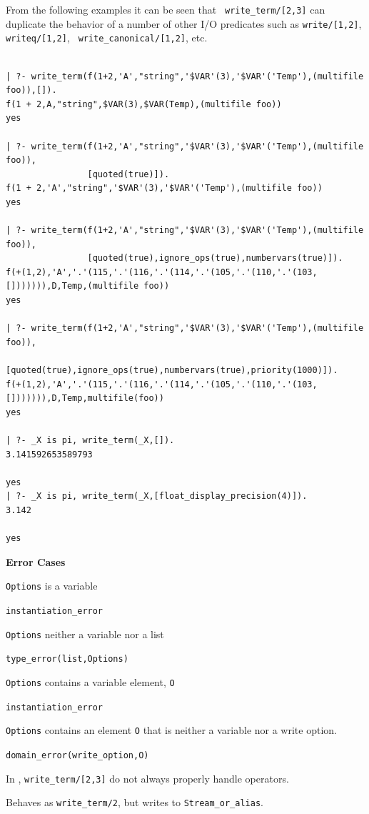 \begin{description}
From the following examples it can be seen that {\tt
write\_term/[2,3]} can duplicate the behavior of a number of other
I/O predicates such as {\tt write/[1,2]}, {\tt writeq/[1,2]}, {\tt
write\_canonical/[1,2]}, etc.
{\small
\begin{verbatim}

| ?- write_term(f(1+2,'A',"string",'$VAR'(3),'$VAR'('Temp'),(multifile foo)),[]).
f(1 + 2,A,"string",$VAR(3),$VAR(Temp),(multifile foo))
yes

| ?- write_term(f(1+2,'A',"string",'$VAR'(3),'$VAR'('Temp'),(multifile foo)),
                [quoted(true)]).
f(1 + 2,'A',"string",'$VAR'(3),'$VAR'('Temp'),(multifile foo))
yes

| ?- write_term(f(1+2,'A',"string",'$VAR'(3),'$VAR'('Temp'),(multifile foo)),
                [quoted(true),ignore_ops(true),numbervars(true)]).
f(+(1,2),'A','.'(115,'.'(116,'.'(114,'.'(105,'.'(110,'.'(103,[])))))),D,Temp,(multifile foo))
yes

| ?- write_term(f(1+2,'A',"string",'$VAR'(3),'$VAR'('Temp'),(multifile foo)),
                [quoted(true),ignore_ops(true),numbervars(true),priority(1000)]).
f(+(1,2),'A','.'(115,'.'(116,'.'(114,'.'(105,'.'(110,'.'(103,[])))))),D,Temp,multifile(foo))
yes

| ?- _X is pi, write_term(_X,[]).
3.141592653589793

yes
| ?- _X is pi, write_term(_X,[float_display_precision(4)]).
3.142

yes
\end{verbatim}
}

{\bf Error Cases} 
\bi
\item 	{\tt Options} is a variable
\bi
\item    {\tt instantiation\_error}
\ei
\item 	{\tt Options} neither a variable nor a list
\bi
\item    {\tt type\_error(list,Options)}
\ei
\item 	{\tt Options} contains a variable element, {\tt O}
\bi
\item    {\tt instantiation\_error}
\ei
\item 	{\tt Options} contains an element {\tt O} that is neither a variable
nor a write option.
\bi
\item    {\tt domain\_error(write\_option,O)}
\ei
\ei

\compatibility In \version{}, {\tt write\_term/[2,3]} do not always
properly handle operators.

% 
Behaves as {\tt write\_term/2}, but writes to {\tt Stream\_or\_alias}.


\end{description}
